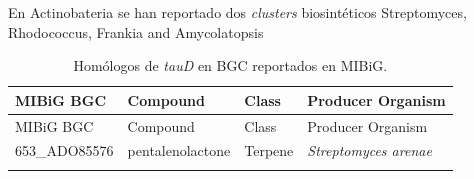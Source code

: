 \documentclass[12pt,twoside]{reedthesis}
\begin{document}
  En Actinobateria se han reportado dos \emph{clusters} biosintéticos
  Streptomyces, Rhodococcus, Frankia and Amycolatopsis
  
  \begin{longtable}[]{@{}llll@{}}
  \caption{Homólogos de \emph{tauD} en BGC reportados en
  MIBiG.\label{tab:tauD}}\tabularnewline
  \toprule
  \begin{minipage}[b]{0.19\columnwidth}\raggedright\strut
  MIBiG BGC\strut
  \end{minipage} & \begin{minipage}[b]{0.20\columnwidth}\raggedright\strut
  Compound\strut
  \end{minipage} & \begin{minipage}[b]{0.15\columnwidth}\raggedright\strut
  Class\strut
  \end{minipage} & \begin{minipage}[b]{0.34\columnwidth}\raggedright\strut
  Producer Organism\strut
  \end{minipage}\tabularnewline
  \midrule
  \endfirsthead
  \toprule
  \begin{minipage}[b]{0.19\columnwidth}\raggedright\strut
  MIBiG BGC\strut
  \end{minipage} & \begin{minipage}[b]{0.20\columnwidth}\raggedright\strut
  Compound\strut
  \end{minipage} & \begin{minipage}[b]{0.15\columnwidth}\raggedright\strut
  Class\strut
  \end{minipage} & \begin{minipage}[b]{0.34\columnwidth}\raggedright\strut
  Producer Organism\strut
  \end{minipage}\tabularnewline
  \midrule
  \endhead
  \begin{minipage}[t]{0.19\columnwidth}\raggedright\strut
  653\_ADO85576\strut
  \end{minipage} & \begin{minipage}[t]{0.20\columnwidth}\raggedright\strut
  pentalenolactone\strut
  \end{minipage} & \begin{minipage}[t]{0.15\columnwidth}\raggedright\strut
  Terpene\strut
  \end{minipage} & \begin{minipage}[t]{0.34\columnwidth}\raggedright\strut
  \emph{Streptomyces arenae}\strut
  \end{minipage}\tabularnewline
  \begin{minipage}[t]{0.19\columnwidth}\raggedright\strut

\end{minipage}
\end{longtable}
\end{document}
